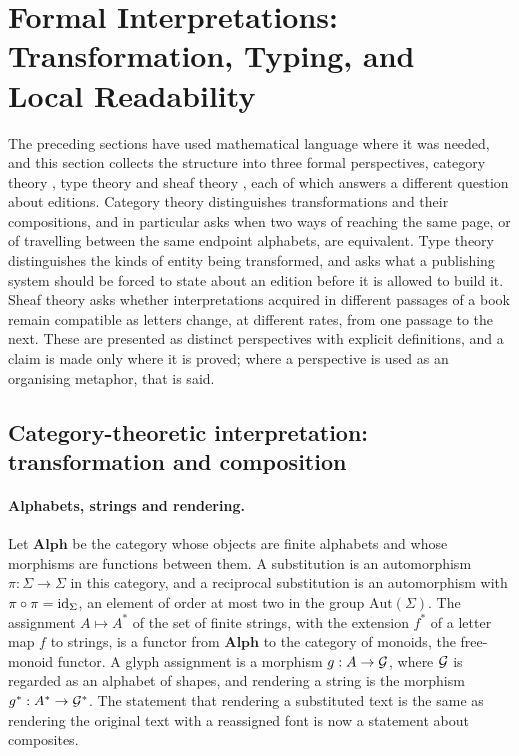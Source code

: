 \section[Formal Interpretations: Transformation, Typing, and Local Readability]{Formal Interpretations: Transformation, Typing, and\texorpdfstring{\\}{ }Local Readability}\label{sec:formal}

The preceding sections have used mathematical language where it was needed, and this section collects the structure into three formal perspectives, category theory \citep{maclane1998}, type theory \citep{martinlof1984,pierce2002} and sheaf theory \citep{maclane1992}, each of which answers a different question about editions. Category theory distinguishes transformations and their compositions, and in particular asks when two ways of reaching the same page, or of travelling between the same endpoint alphabets, are equivalent. Type theory distinguishes the kinds of entity being transformed, and asks what a publishing system should be forced to state about an edition before it is allowed to build it. Sheaf theory asks whether interpretations acquired in different passages of a book remain compatible as letters change, at different rates, from one passage to the next. These are presented as distinct perspectives with explicit definitions, and a claim is made only where it is proved; where a perspective is used as an organising metaphor, that is said.

\subsection{Category-theoretic interpretation: transformation and composition}

\paragraph{Alphabets, strings and rendering.}
Let $\mathbf{Alph}$ be the category whose objects are finite alphabets and whose morphisms are functions between them. A substitution is an automorphism $\pi:\Sigma\to\Sigma$ in this category, and a reciprocal substitution is an automorphism with $\pi\circ\pi=\mathrm{id}_\Sigma$, an element of order at most two in the group $\mathrm{Aut}(\Sigma)$. The assignment $A\mapsto A^{*}$ of the set of finite strings, with the extension $f^{*}$ of a letter map $f$ to strings, is a functor from $\mathbf{Alph}$ to the category of monoids, the free-monoid functor. A glyph assignment is a morphism $g:A\to\mathcal{G}$, where $\mathcal{G}$ is regarded as an alphabet of shapes, and rendering a string is the morphism $g^{*}:A^{*}\to\mathcal{G}^{*}$. The statement that rendering a substituted text is the same as rendering the original text with a reassigned font is now a statement about composites.

